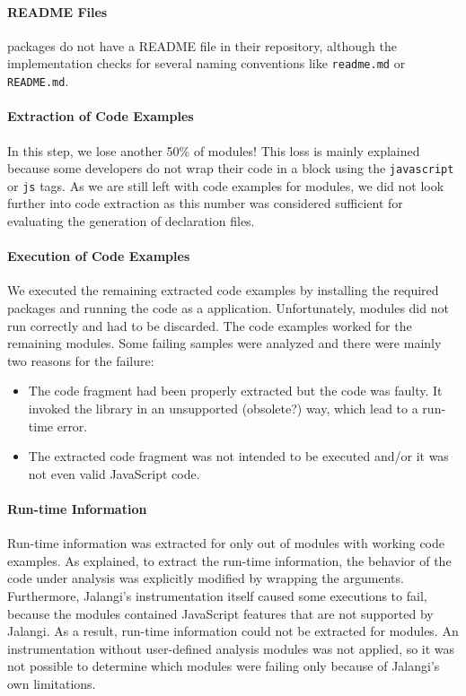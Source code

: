 \documentclass[sigplan,screen]{acmart}
\begin{document}
\paragraph*{README Files}
\CountModulesWithoutReadmeFile{} packages do not have a README file in their repository, although
the implementation checks for several naming conventions like
\texttt{readme.md} or \texttt{README.md}. 

\paragraph*{Extraction of Code Examples}
In this step, we lose another 50\% of modules! This loss is mainly
explained because some developers do not wrap their code in a block
using the \texttt{javascript} or \texttt{js} tags. As we are
still left with code examples for \CountModulesWithCodeExamples{} modules, we did not look
further into code extraction as this number was considered sufficient for
evaluating the generation of declaration files. 

\paragraph*{Execution of Code Examples}
We executed the remaining \CountModulesWithCodeExamples{} extracted code examples by installing the
required packages and running the code as a \NodeJS{}
application. Unfortunately,
\CountModulesNotWorkingCodeExamples{} modules did not run correctly and had to be
discarded.
The code examples worked for the remaining \CountModulesWorkingCodeExamples{}
modules.
Some failing samples were analyzed and there were mainly
two reasons for the failure: 
\begin{itemize}
\item The code fragment had been properly extracted but the code was
  faulty. It invoked the library in an unsupported
  (obsolete?) way, which lead to a run-time error.
\item The extracted code fragment was not intended to be executed
  and/or it was not even valid JavaScript code. 
\end{itemize}

\paragraph*{Run-time Information}
Run-time information was extracted for only \CountModulesRunTimeInfoExtracted{} out of \CountModulesWorkingCodeExamples{} modules with working code
examples. As explained, to extract the run-time information, the behavior of the code
under analysis was explicitly modified by wrapping the arguments. Furthermore, Jalangi's
instrumentation itself caused some executions to fail, because the modules contained
JavaScript features that are not supported by Jalangi. As a result, run-time information
could not be extracted for \CountModulesRunTimeInfoCouldNotBeExtracted{} modules. An instrumentation without user-defined analysis
modules was not applied, so it was not possible to determine which modules were failing
only because of Jalangi's own limitations. 
\end{document}

